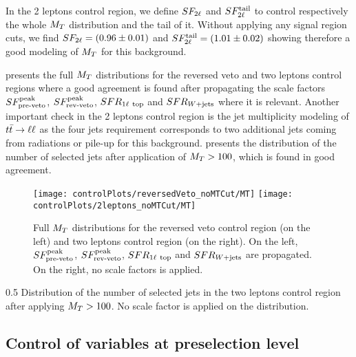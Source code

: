         In the 2 leptons control region, we define $SF_{2\ell}$ and $SF_{2\ell}^{\text{tail}}$ to
        control respectively the whole $M_T$ distribution and the tail of it.
        Without applying any signal region cuts, we find $SF_{2\ell} = (0.96 \pm 0.01)$
        and $SF_{2\ell}^{\text{tail}} = (1.01 \pm 0.02)$ showing therefore a good modeling of $M_T$
        for this background.

         presents the full $M_T$ distributions
        for the reversed veto and two leptons control regions where a good agreement is
        found after propagating the scale factors $SF_{\text{pre-veto}}^{\text{peak}}$, $SF_{\text{rev-veto}}^{\text{peak}}$, $SFR_{1\ell~\text{top}}$
        and $SFR_{\text{$W$+jets}}$ where it is relevant.
        Another important check in the 2 leptons control region is the jet multiplicity
        modeling of $t\bar{t} \rightarrow \ell \ell$ as the four jets requirement corresponds to two
        additional jets coming from radiations or pile-up for this background.
         presents the distribution of the number
        of selected jets after application of $M_T>100$, which is found in good agreement.


        \begin{figure}[h!]
            \centering
            \texttt{[image: controlPlots/reversedVeto\_noMTCut/MT]}
            \texttt{[image: controlPlots/2leptons\_noMTCut/MT]}
            \caption{Full $M_T$ distributions for the reversed veto control region (on the left) and two leptons control region (on the right). On the left, $SF_{\text{pre-veto}}^{\text{peak}}$, $SF_{\text{rev-veto}}^{\text{peak}}$, $SFR_{1\ell~\text{top}}$ and $SFR_{\text{$W$+jets}}$ are propagated. On the right, no scale factors is applied.}
                    \label{fig:preselMT2leptonAndLepPlusVeto}
        \end{figure}

                     {0.5}
                     {Distribution of the number of selected jets in the two leptons control
                     region after applying $M_T > 100$. No scale factor is applied on the
                     distribution.}

        \subsection{Control of variables at preselection level}


